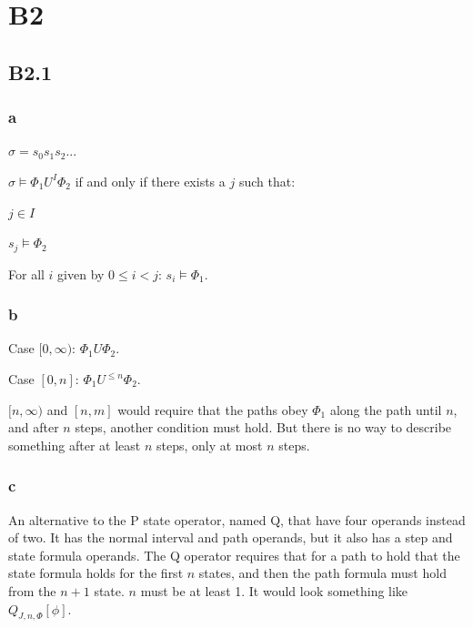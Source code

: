 
\section{B2}

\subsection{B2.1}

\subsubsection{a}


$\sigma = s_0 s_1 s_2 ..$.

$\sigma \models \Phi_1 U^I \Phi_2$ if and only if there exists a $j$
such that:

$j \in I$

$s_j \models \Phi_2$

For all $i$ given by $0 \leq i < j$: $s_i \models \Phi_1$.

\subsubsection{b}

Case $[0, \infty)$: $\Phi_1 U \Phi_2$.

Case $[0, n]$: $\Phi_1 U^{\leq n} \Phi_2$.

$[n, \infty)$ and $[n, m]$ would require that the paths obey $\Phi_1$
along the path until $n$, and after $n$ steps, another condition must hold.
But there is no way to describe something after at least $n$ steps,
only at most $n$ steps.

\subsubsection{c}

An alternative to the P state operator, named Q,
that have four operands instead of two.
It has the normal interval and path operands,
but it also has a step and state formula operands.
The Q operator requires that for a path to hold that the state formula holds
for the first $n$ states, and then the path formula
must hold from the $n+1$ state.
$n$ must be at least 1.
It would look something like $Q_{J,n, \Phi} [\phi]$.

